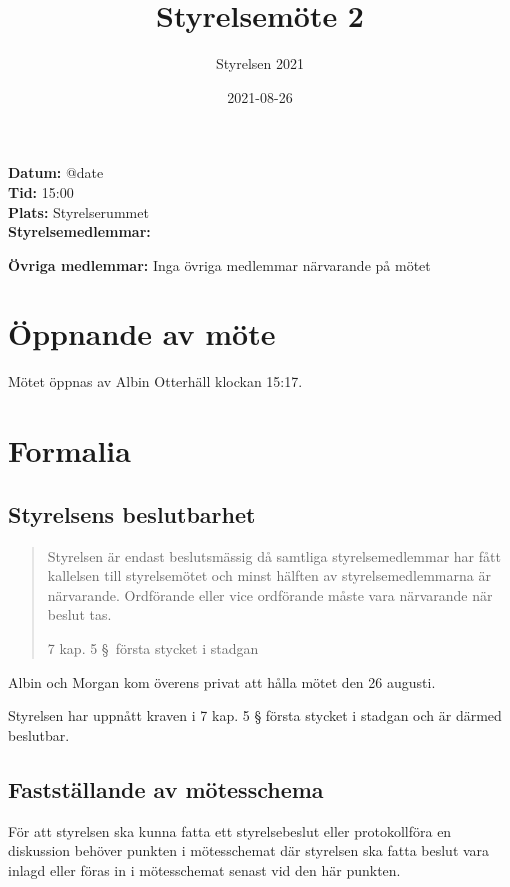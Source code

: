 \documentclass[protokoll]{dvd}
\begin{document}
\title{Styrelsemöte 2}
\author{Styrelsen 2021}
\date{2021-08-26}

\textbf{Datum:} \csname @date\endcsname\\
\textbf{Tid:} 15:00\\
\textbf{Plats:} Styrelserummet\\
\textbf{Styrelsemedlemmar:}
\begin{närvarande}
\end{närvarande}
\textbf{Övriga medlemmar:} Inga övriga medlemmar närvarande på mötet

\section{Öppnande av möte}

Mötet öppnas av Albin Otterhäll klockan 15:17.

\section{Formalia}

\subsection{Styrelsens beslutbarhet}

\blockquote[7 kap. 5 \S~första stycket i stadgan][]{%
    Styrelsen är endast beslutsmässig då samtliga styrelsemedlemmar har fått kallelsen till styrelsemötet och minst hälften av styrelsemedlemmarna är närvarande.
    Ordförande eller vice ordförande måste vara närvarande när beslut tas.
}

Albin och Morgan kom överens privat att hålla mötet den 26 augusti.

\begin{beslut}
    \item Styrelsen har uppnått kraven i 7 kap. 5 § första stycket i stadgan och är därmed beslutbar.
\end{beslut}

\subsection{Fastställande av mötesschema}

För att styrelsen ska kunna fatta ett styrelsebeslut eller protokollföra en diskussion behöver punkten i mötesschemat där styrelsen ska fatta beslut vara inlagd eller föras in i mötesschemat senast vid den här punkten.
\end{document}
